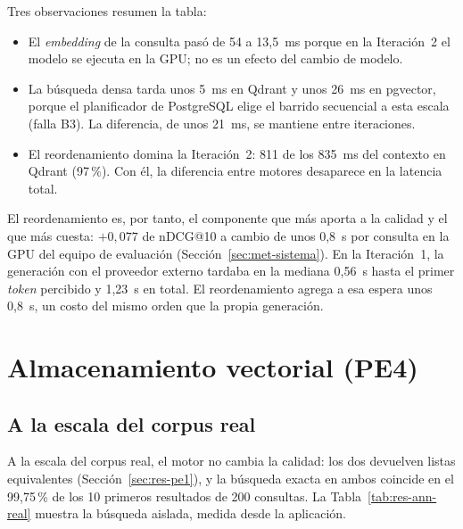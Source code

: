 Tres observaciones resumen la tabla:
\begin{itemize}
    \item El \textit{embedding} de la consulta pasó de 54 a 13,5~ms porque en la Iteración~2 el modelo se ejecuta en la GPU; no es un efecto del cambio de modelo.
    \item La búsqueda densa tarda unos 5~ms en Qdrant y unos 26~ms en pgvector, porque el planificador de PostgreSQL elige el barrido secuencial a esta escala (falla B3). La diferencia, de unos 21~ms, se mantiene entre iteraciones.
    \item El reordenamiento domina la Iteración~2: 811 de los 835~ms del contexto en Qdrant (97\,\%). Con él, la diferencia entre motores desaparece en la latencia total.
\end{itemize}

El reordenamiento es, por tanto, el componente que más aporta a la calidad y el que más cuesta: $+0{,}077$ de nDCG@10 a cambio de unos 0,8~s por consulta en la GPU del equipo de evaluación (Sección~\ref{sec:met-sistema}). En la Iteración~1, la generación con el proveedor externo tardaba en la mediana 0,56~s hasta el primer \textit{token} percibido y 1,23~s en total. El reordenamiento agrega a esa espera unos 0,8~s, un costo del mismo orden que la propia generación.


\section{Almacenamiento vectorial (PE4)}
\label{sec:res-pe4}

\subsection{A la escala del corpus real}

A la escala del corpus real, el motor no cambia la calidad: los dos devuelven listas equivalentes (Sección~\ref{sec:res-pe1}), y la búsqueda exacta en ambos coincide en el 99,75\,\% de los 10 primeros resultados de 200 consultas. La Tabla~\ref{tab:res-ann-real} muestra la búsqueda aislada, medida desde la aplicación.

